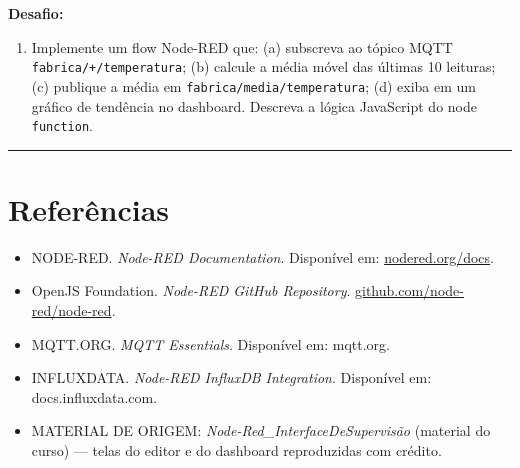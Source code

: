 \textbf{Desafio:}

\begin{enumerate}
\def\labelenumi{\arabic{enumi}.}
\setcounter{enumi}{5}
\tightlist
\item
  Implemente um flow Node-RED que: (a) subscreva ao tópico MQTT \passthrough{\lstinline!fabrica/+/temperatura!}; (b) calcule a média móvel das últimas 10 leituras; (c) publique a média em \passthrough{\lstinline!fabrica/media/temperatura!}; (d) exiba em um gráfico de tendência no dashboard. Descreva a lógica JavaScript do node \passthrough{\lstinline!function!}.
\end{enumerate}

\begin{center}\rule{0.5\linewidth}{0.5pt}\end{center}

\section{Referências}\label{referuxeancias}

\begin{itemize}
\tightlist
\item
  NODE-RED. \emph{Node-RED Documentation}. Disponível em: \url{nodered.org/docs}.
\item
  OpenJS Foundation. \emph{Node-RED GitHub Repository}. \url{github.com/node-red/node-red}.
\item
  MQTT.ORG. \emph{MQTT Essentials}. Disponível em: mqtt.org.
\item
  INFLUXDATA. \emph{Node-RED InfluxDB Integration}. Disponível em: docs.influxdata.com.
\item
  MATERIAL DE ORIGEM: \emph{Node-Red\_InterfaceDeSupervisão} (material do curso) --- telas do editor e do
  dashboard reproduzidas com crédito.
\end{itemize}
